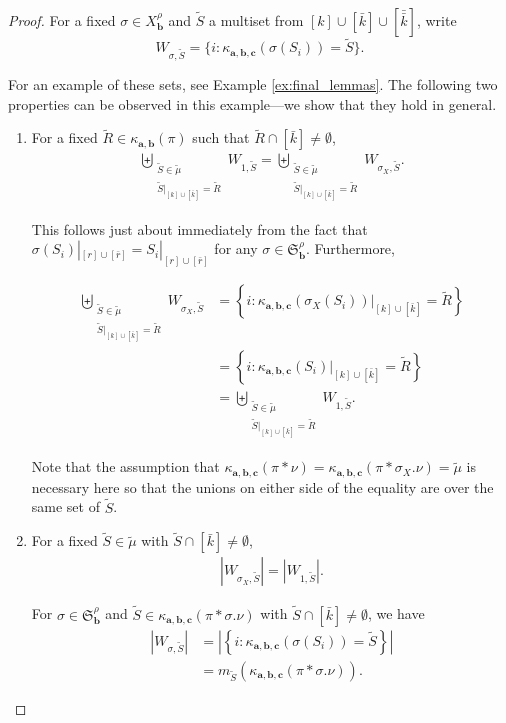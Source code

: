 \documentclass[ALCO,Unicode,published]{cedram}
\newcommand{\SG}{\mathfrak{S}}
\newcommand{\bfa}{{\boldsymbol{a}}}
\newcommand{\bfb}{{\boldsymbol{b}}}
\newcommand{\bfc}{{\boldsymbol{c}}}
\newcommand{\tmu}{{\tilde{\mu}}}
\newcommand{\tS}{{\tilde{S}}}
\newcommand{\tR}{{\tilde{R}}}
\newcommand{\ov}[1]{\bar{#1}}
\newcommand{\ovb}[1]{\left[\ov{#1}\right]}
\newcommand{\ovov}[1]{\bar{\bar{#1}}}
\newcommand{\ovovb}[1]{\left[\ovov{#1}\right]}
\newcommand{\abs}[1]{\left| #1\right |}
\begin{document}
\begin{proof}
For a fixed $\sigma\in X_\bfb^\rho$ and $\tS$ a multiset from $[k]\cup\ovb{k}\cup\ovovb{k}$, write \[W_{\sigma,\tS}=\{i:\kappa_{\bfa,\bfb,\bfc}(\sigma(S_i))=\tS\}.\]

For an example of these sets, see Example \ref{ex:final_lemmas}. The following two properties can be observed in this example---we show that they hold in general.

\begin{enumerate}
    \item[1.] For a fixed $\tR\in\kappa_{\bfa,\bfb}(\pi)$ such that $\tR\cap \ovb{k}\neq\emptyset$,\begin{align*}
    \biguplus_{\substack{\tS\in\tmu\\\tS|_{[k]\cup\ovb{k}}=\tR}}W_{1,\tS}=\biguplus_{\substack{\tS\in\tmu\\\tS|_{[k]\cup\ovb{k}}=\tR}}W_{\sigma_X,\tS}.
\end{align*}

This follows just about immediately from the fact that $\sigma(S_i)|_{[r]\cup\ovb{r}}=S_i|_{[r]\cup\ovb{r}}$ for any $\sigma\in \SG_\bfb^\rho$. Furthermore,

\begin{align*}
    \biguplus_{\substack{\tS\in\tmu\\\tS|_{[k]\cup\ovb{k}}=\tR}}W_{\sigma_X,\tS}&=\left\{i:\kappa_{\bfa,\bfb,\bfc}(\sigma_X(S_i))|_{[k]\cup\ovb{k}}=\tR\right\}\\
    &=\left\{i:\kappa_{\bfa,\bfb,\bfc}(S_i)|_{[k]\cup\ovb{k}}=\tR\right\}\\
    &=\biguplus_{\substack{\tS\in\tmu\\\tS|_{[k]\cup\ovb{k}}=\tR}}W_{1,\tS}.
\end{align*}

Note that the assumption that $\kappa_{\bfa,\bfb,\bfc}(\pi\ast\nu)=\kappa_{\bfa,\bfb,\bfc}(\pi\ast \sigma_X.\nu)=\tmu$ is necessary here so that the unions on either side of the equality are over the same set of $\tS$.

\item[2.] For a fixed $\tS\in\tmu$ with $\tS\cap\ovb{k}\neq\emptyset$, \begin{align*}
    |W_{\sigma_X,\tS}|=|W_{1,\tS}|.
\end{align*}

For $\sigma\in \SG_\bfb^\rho$ and $\tS\in\kappa_{\bfa,\bfb,\bfc}(\pi\ast\sigma.\nu)$ with $\tS\cap\ovb{k}\neq\emptyset$, we have
\begin{align*}
    \abs{W_{\sigma,\tS}}&=\abs{\left\{i:\kappa_{\bfa,\bfb,\bfc}(\sigma(S_i))=\tS\right\}}\\
    &=m_{\tS}(\kappa_{\bfa,\bfb,\bfc}(\pi\ast\sigma.\nu)).
\end{align*}


\end{enumerate}
\end{proof}
\end{document}
